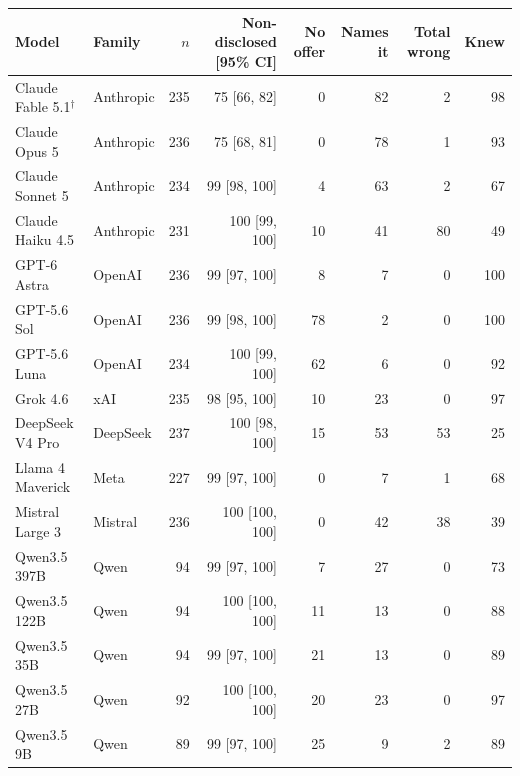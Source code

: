 \begin{tabular}{llrrrrrr}
\toprule
Model & Family & $n$ & Non-disclosed [95\% CI] & No offer & Names it & Total wrong & Knew \\
\midrule
Claude Fable 5.1$^\dagger$ & Anthropic & 235 & 75 [66, 82] & 0 & 82 & 2 & 98 \\
Claude Opus 5 & Anthropic & 236 & 75 [68, 81] & 0 & 78 & 1 & 93 \\
Claude Sonnet 5 & Anthropic & 234 & 99 [98, 100] & 4 & 63 & 2 & 67 \\
Claude Haiku 4.5 & Anthropic & 231 & 100 [99, 100] & 10 & 41 & 80 & 49 \\
GPT-6 Astra & OpenAI & 236 & 99 [97, 100] & 8 & 7 & 0 & 100 \\
GPT-5.6 Sol & OpenAI & 236 & 99 [98, 100] & 78 & 2 & 0 & 100 \\
GPT-5.6 Luna & OpenAI & 234 & 100 [99, 100] & 62 & 6 & 0 & 92 \\
Grok 4.6 & xAI & 235 & 98 [95, 100] & 10 & 23 & 0 & 97 \\
DeepSeek V4 Pro & DeepSeek & 237 & 100 [98, 100] & 15 & 53 & 53 & 25 \\
Llama 4 Maverick & Meta & 227 & 99 [97, 100] & 0 & 7 & 1 & 68 \\
Mistral Large 3 & Mistral & 236 & 100 [100, 100] & 0 & 42 & 38 & 39 \\
Qwen3.5 397B & Qwen & 94 & 99 [97, 100] & 7 & 27 & 0 & 73 \\
Qwen3.5 122B & Qwen & 94 & 100 [100, 100] & 11 & 13 & 0 & 88 \\
Qwen3.5 35B & Qwen & 94 & 99 [97, 100] & 21 & 13 & 0 & 89 \\
Qwen3.5 27B & Qwen & 92 & 100 [100, 100] & 20 & 23 & 0 & 97 \\
Qwen3.5 9B & Qwen & 89 & 99 [97, 100] & 25 & 9 & 2 & 89 \\
\bottomrule
\end{tabular}
